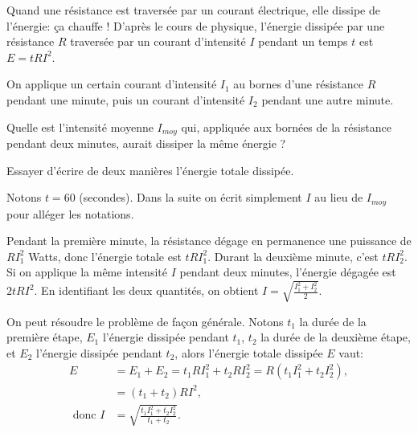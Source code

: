 \begin{exo}
Quand une résistance est traversée par un courant électrique, elle dissipe de l'énergie: ça chauffe !
D'après le cours de physique, l'énergie dissipée par une résistance $R$ traversée par un courant d'intensité $I$ pendant un temps $t$ est $E=tRI^2$.

On applique un certain courant d'intensité $I_1$ au bornes d'une résistance $R$ pendant une minute, puis un courant d'intensité $I_2$ pendant une autre minute. 

Quelle est \og l'intensité moyenne \fg{} $I_{moy}$ qui, appliquée aux bornées de la résistance pendant deux minutes, aurait dissiper la même énergie ?

\begin{hint} %
Essayer d'écrire de deux manières l'énergie totale dissipée.
\end{hint}

\begin{sol} %
Notons $t=60$ (secondes). Dans la suite on écrit simplement $I$ au lieu de $I_{moy}$ pour alléger les notations.

Pendant la première minute, la résistance dégage en permanence une puissance de $RI_1^2$ Watts, donc l'énergie totale est $tRI_1^2$. Durant la deuxième minute, c'est $tRI_2^2$.
Si on applique la même intensité $I$ pendant deux minutes, l'énergie dégagée est $2tRI^2$. En identifiant les deux quantités, on obtient $I = \sqrt{\frac{I_1^2+I_2^2}{2}}$.

On peut résoudre le problème de façon générale. Notons $t_1$ la durée de la première étape, $E_1$ l'énergie dissipée pendant $t_1$, $t_2$ la durée de la deuxième étape, et $E_2$ l'énergie dissipée pendant $t_2$, alors l'énergie totale dissipée $E$ vaut:
\begin{align*}
E &= E_1+E_2= t_1 R I_1^2 + t_2 R I_2^2= R (t_1 I_1^2 + t_2 I_2^2), \\
& = (t_1+t_2)RI^2, \\
\text{ donc } I & =\sqrt{\frac{t_1I_1^2 + t_2I_2^2}{t_1+t_2}}.
\end{align*}
\end{sol}
\end{exo}

